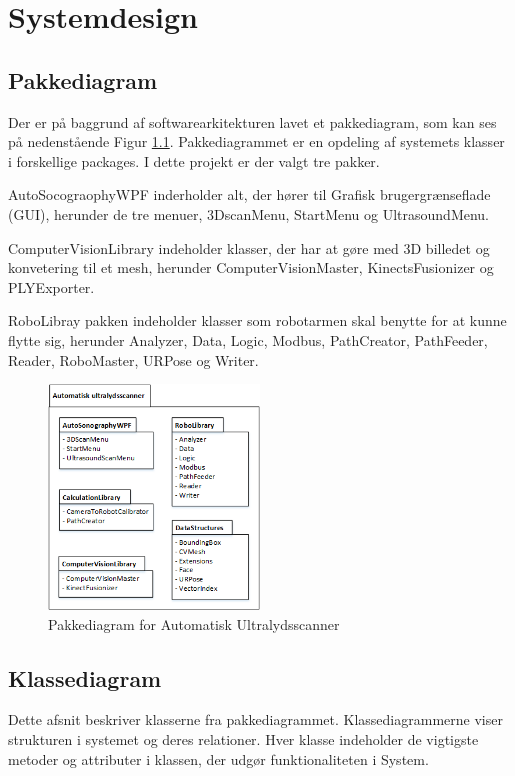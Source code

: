 \chapter{Systemdesign}\label{Systemdesign}

\section{Pakkediagram}
Der er på baggrund af softwarearkitekturen lavet et pakkediagram, som kan ses på nedenstående Figur \ref{Pakkediagram}. Pakkediagrammet er en opdeling af systemets klasser i forskellige packages. I dette projekt er der valgt tre pakker. 

AutoSocograophyWPF inderholder alt, der hører til Grafisk brugergrænseflade (GUI), herunder de tre menuer, 3DscanMenu, StartMenu og UltrasoundMenu. 

ComputerVisionLibrary indeholder klasser, der har at gøre med 3D billedet og konvetering til et mesh, herunder ComputerVisionMaster, KinectsFusionizer og PLYExporter. 

RoboLibray pakken indeholder klasser som robotarmen skal benytte for at kunne flytte sig, herunder Analyzer, Data, Logic, Modbus, PathCreator, PathFeeder, Reader, RoboMaster, URPose og Writer. 

\begin{figure}[H]
    \centering
    \includegraphics[width=0.5\textwidth]{figurer/d/Design/Pakkediagram}
    \caption{Pakkediagram for Automatisk Ultralydsscanner}
    \label{Pakkediagram}
\end{figure}
\newpage
\section{Klassediagram}
Dette afsnit beskriver klasserne fra pakkediagrammet. Klassediagrammerne viser strukturen i systemet og deres relationer. Hver klasse indeholder de vigtigste metoder og attributer i klassen, der udgør funktionaliteten i System. 

